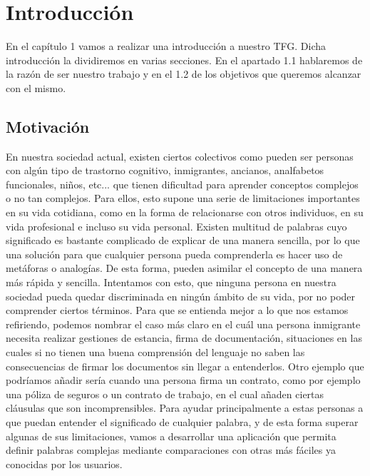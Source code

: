 \chapter{Introducción}
\label{cap:introduccion}


\begin{resumen}
	En el capítulo 1 vamos a realizar una introducción a nuestro TFG. Dicha introducción la dividiremos en varias secciones. En el apartado 1.1 hablaremos de la razón de ser nuestro trabajo y en el 1.2 de los objetivos que queremos alcanzar con el mismo.	
\end{resumen}


\section{Motivación}
\label{cap:sec:motivacion}
En nuestra sociedad actual, existen ciertos colectivos como pueden ser personas con algún tipo de trastorno cognitivo, inmigrantes, ancianos, analfabetos funcionales, niños, etc... que tienen dificultad para aprender conceptos complejos o no tan complejos. Para ellos, esto supone una serie de limitaciones importantes en su vida cotidiana, como en la forma de relacionarse con otros individuos, en su vida profesional e incluso su vida personal.
Existen multitud de palabras cuyo significado es bastante complicado de explicar de una manera sencilla, por lo que una solución para que cualquier persona pueda comprenderla es hacer uso de metáforas o analogías. De esta forma, pueden asimilar el concepto de una manera más rápida y sencilla. Intentamos con esto, que ninguna persona en nuestra sociedad pueda quedar discriminada en ningún ámbito de su vida, por no poder comprender ciertos términos.
Para que se entienda mejor a lo que nos estamos refiriendo, podemos nombrar el caso más claro en el cuál una persona inmigrante necesita realizar gestiones de estancia, firma de documentación, situaciones en las cuales si no tienen una buena comprensión del lenguaje no saben las consecuencias de firmar los documentos sin llegar a entenderlos. 
Otro ejemplo que podríamos añadir sería cuando una persona firma un contrato, como por ejemplo una póliza de seguros o un contrato de trabajo, en el cual añaden ciertas cláusulas que son incomprensibles. 
\newline
Para ayudar principalmente a estas personas a que puedan entender el significado de cualquier palabra, y de esta forma superar algunas de sus limitaciones, vamos a desarrollar una aplicación que permita definir palabras complejas mediante comparaciones con otras más fáciles ya conocidas por los usuarios. 

